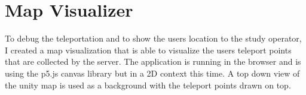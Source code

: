 \section{Map Visualizer}
To debug the teleportation and to show the users location to the study operator, I created a map visualization that is able to visualize the users teleport points that are collected by the server. The application is running in the browser and is using the p5.js canvas library but in a 2D context this time. A top down view of the unity map is used as a background with the teleport points drawn on top.
